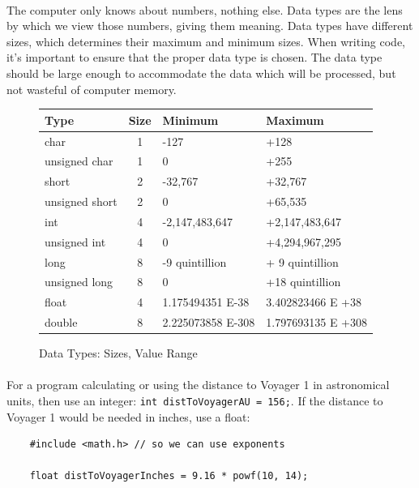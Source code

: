 \documentclass[letter,11pt]{article}
\begin{document}
\paragraph{}The computer only knows about numbers, nothing else. Data types are the lens by which we view those numbers, giving them meaning. Data types have different sizes, which determines their maximum and minimum sizes. When writing code, it's important to ensure that the proper data type is chosen. The data type should be large enough to accommodate the data which will be processed, but not wasteful of computer memory.
\begin{figure}[h!]
    \centering
    \begin{tabular}{lcll}
        Type           & Size & Minimum & Maximum \\ \hline
        char           & 1    & -127    & +128 \\
        unsigned char  & 1    & 0       & +255 \\
        short          & 2    & -32,767 & +32,767   \\
        unsigned short & 2    & 0       & +65,535 \\
        int            & 4    & -2,147,483,647 & +2,147,483,647 \\
        unsigned int   & 4    & 0              & +4,294,967,295 \\
        long           & 8    & -9 quintillion & + 9 quintillion \\
        unsigned long  & 8    & 0              & +18 quintillion \\
        float          & 4    & 1.175494351 E-38  & 3.402823466 E +38 \\
        double         & 8    & 2.225073858 E-308 & 1.797693135 E +308
    \end{tabular}
    \caption{Data Types: Sizes, Value Range}
    \label{fig:datatypeschart}
\end{figure}

\paragraph{}For a program calculating or using the distance to Voyager 1 in astronomical units, then use an integer: \texttt{int distToVoyagerAU = 156;}. If the distance to Voyager 1 would be needed in inches, use a float: 
\begin{verbatim}
    #include <math.h> // so we can use exponents

    float distToVoyagerInches = 9.16 * powf(10, 14);
\end{verbatim}
\end{document}
